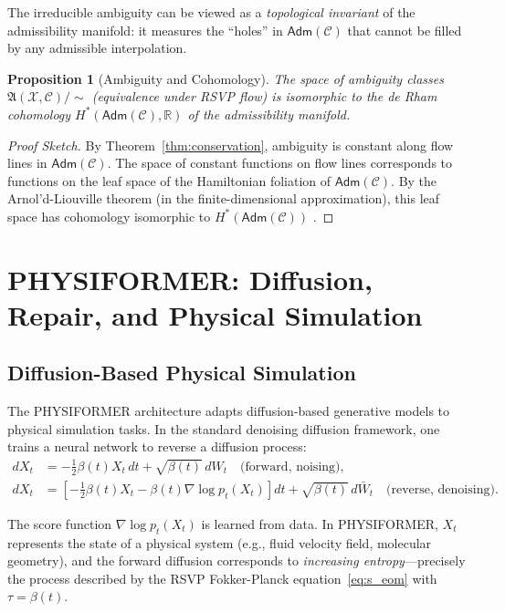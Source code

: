 \documentclass[a4paper,12pt]{article}
\newtheorem{proposition}[theorem]{Proposition}
\theoremstyle{definition}
\newcommand{\X}{\mathcal{X}}
\newcommand{\Adm}{\mathsf{Adm}}
\newcommand{\Amb}{\mathfrak{A}}
\newcommand{\R}{\mathbb{R}}
\begin{document}
The irreducible ambiguity can be viewed as a \emph{topological invariant} of the admissibility manifold: it measures the ``holes'' in $\Adm(\mathcal{C})$ that cannot be filled by any admissible interpolation.

\begin{proposition}[Ambiguity and Cohomology]
\label{prop:ambi_cohom}
The space of ambiguity classes $\Amb(\X, \mathcal{C}) / \sim$ (equivalence under RSVP flow) is isomorphic to the de Rham cohomology $H^*(\Adm(\mathcal{C}), \R)$ of the admissibility manifold.
\end{proposition}

\begin{proof}[Proof Sketch]
By Theorem~\ref{thm:conservation}, ambiguity is constant along flow lines in $\Adm(\mathcal{C})$. The space of constant functions on flow lines corresponds to functions on the leaf space of the Hamiltonian foliation of $\Adm(\mathcal{C})$. By the Arnol'd-Liouville theorem (in the finite-dimensional approximation), this leaf space has cohomology isomorphic to $H^*(\Adm(\mathcal{C}))$ \cite{Arnold1989}.
\end{proof}

\section{PHYSIFORMER: Diffusion, Repair, and Physical Simulation}
\label{sec:physiformer}

\subsection{Diffusion-Based Physical Simulation}

The PHYSIFORMER architecture \cite{Chen2026} adapts diffusion-based generative models to physical simulation tasks. In the standard denoising diffusion framework, one trains a neural network to reverse a diffusion process:
\begin{align}
dX_t &= -\frac{1}{2}\beta(t) X_t \, dt + \sqrt{\beta(t)} \, dW_t \quad \text{(forward, noising)}, \\
dX_t &= \left[-\frac{1}{2}\beta(t) X_t - \beta(t) \nabla \log p_t(X_t)\right] dt + \sqrt{\beta(t)} \, d\bar{W}_t \quad \text{(reverse, denoising)}.
\end{align}

The score function $\nabla \log p_t(X_t)$ is learned from data. In PHYSIFORMER, $X_t$ represents the state of a physical system (e.g., fluid velocity field, molecular geometry), and the forward diffusion corresponds to \emph{increasing entropy}—precisely the process described by the RSVP Fokker-Planck equation~\eqref{eq:s_eom} with $\tau = \beta(t)$.
\end{document}
